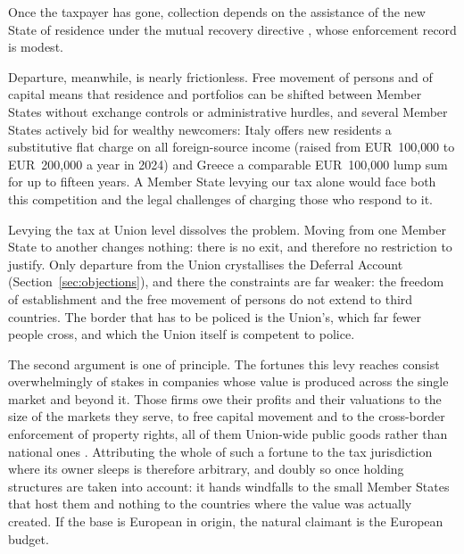 \documentclass[../../main]{subfiles}
\begin{document}
Once the taxpayer has gone, collection depends on the assistance of the new State of residence under the mutual recovery directive \citep{Directive2010_24}, whose enforcement record is modest.

Departure, meanwhile, is nearly frictionless. Free movement of persons and of capital means that residence and portfolios can be shifted between Member States without exchange controls or administrative hurdles, and several Member States actively bid for wealthy newcomers: Italy offers new residents a substitutive flat charge on all foreign-source income (raised from EUR~100{,}000 to EUR~200{,}000 a year in 2024) and Greece a comparable EUR~100{,}000 lump sum for up to fifteen years. A Member State levying our tax alone would face both this competition and the legal challenges of charging those who respond to it.

Levying the tax at Union level dissolves the problem. %
Moving from one Member State to another changes nothing: %
there is no exit, and therefore no restriction to justify. Only departure from the Union crystallises the Deferral Account (Section~\ref{sec:objections}), and there the constraints are far weaker: the freedom of establishment and the free movement of persons do not extend to third countries. %
The border that has to be policed is the Union's, which far fewer people cross, and which the Union itself is competent to police.

The second argument is one of principle. The fortunes this levy reaches consist overwhelmingly of stakes in companies whose value is produced across the single market and beyond it. Those firms owe their profits and their valuations to the size of the markets they serve, to free capital movement and to the cross-border enforcement of property rights, all of them Union-wide public goods rather than national ones \citep{Zucman2024}. Attributing the whole of such a fortune to the tax jurisdiction where its owner sleeps is therefore arbitrary, and doubly so once holding structures are taken into account: it hands windfalls to the small Member States that host them and nothing to the countries where the value was actually created. If the base is European in origin, the natural claimant is the European budget.
\end{document}
